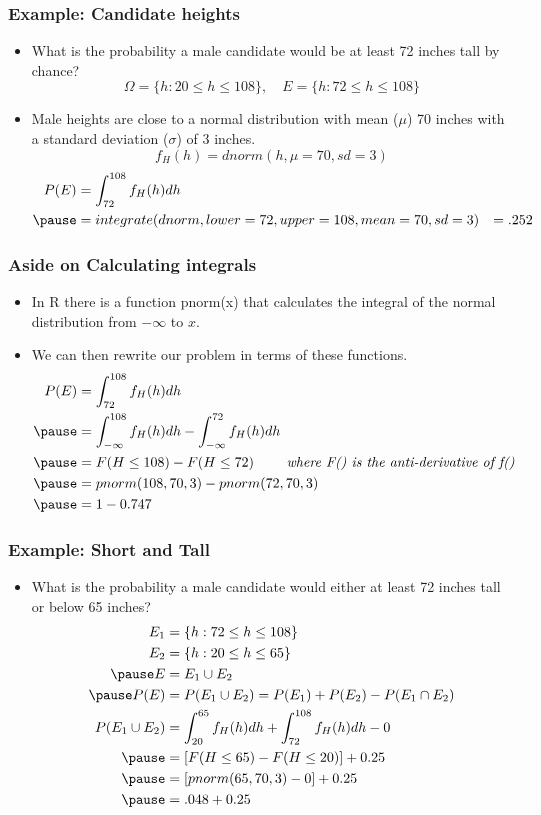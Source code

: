 \documentclass[aspectratio=169, handout]{beamer}
\numberwithin{equation}{section}
\begin{document}
\begin{frame}
\frametitle{Example: Candidate heights}
\begin{itemize}
\item What is the probability a male candidate would be at least 72 inches tall by chance?
$$\Omega = \{h: 20 \leq h \leq 108\}, \quad E = \{h: 72 \leq h \leq 108\}$$
\item Male heights are close to a normal distribution with mean ($\mu$) 70 inches with a standard deviation ($\sigma$) of 3 inches.
$$f_H(h) =dnorm(h, \mu= 70, sd = 3)$$
\begin{align*}
P(E)&=\int_{72}^{108} f_H(h) dh\\\pause
&= integrate(dnorm, lower=72, upper=108, mean= 70, sd = 3)
&=.252
\end{align*}
\end{itemize}
\end{frame}



\begin{frame}
\frametitle{Aside on Calculating integrals}
\begin{itemize}
\item In R there is a function pnorm(x) that calculates the integral of the normal distribution from $-\infty$ to $x$.
\item We can then rewrite our problem in terms of these functions.
\begin{align*}
P(E)&=\int_{72}^{108} f_H(h) dh\\\pause
&=\int_{-\infty}^{108} f_H(h) dh-\int_{-\infty}^{72} f_H(h) dh\\\pause
&= F(H \leq 108)-F(H \leq 72) \ \quad \quad \textit{where F() is the anti-derivative of f()}\\\pause
&=pnorm(108, 70, 3) - pnorm(72, 70, 3)\\\pause
&=1-0.747
\end{align*}
\end{itemize}
\end{frame}


\begin{frame}
\frametitle{Example: Short and Tall}
\begin{itemize}
\item What is the probability a male candidate would either at least 72 inches tall or below 65 inches?
\begin{align*}
E_1 &= \{h: 72 \leq h \leq 108\}\\
E_2 &= \{h: 20 \leq h \leq 65\}\\\pause
E&= E_1\cup E_2\\\pause
P(E)&= P(E_1\cup E_2)=P(E_1)+P(E_2)-P(E_1\cap E_2)\\
P(E_1\cup E_2)&=\int_{20}^{65} f_H(h) dh+\int_{72}^{108} f_H(h) dh-0\\\pause
&= [F(H \leq 65)-F(H \leq 20)]+0.25\\\pause
&=[pnorm(65, 70, 3)-0] +0.25\\\pause
&=.048+0.25
\end{align*}
\end{itemize}
\end{frame}
\end{document}
